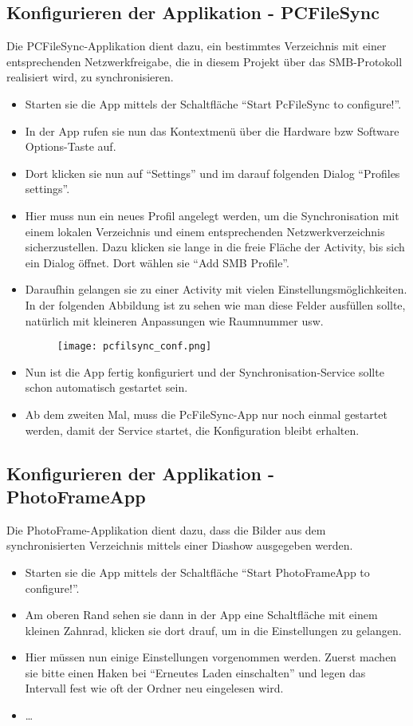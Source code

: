 \begin{flushleft}
  \subsection{Konfigurieren der Applikation - PCFileSync}
  Die PCFileSync-Applikation dient dazu, ein bestimmtes Verzeichnis mit einer entsprechenden Netzwerkfreigabe, die in diesem Projekt über das SMB-Protokoll realisiert wird, zu synchronisieren.
    \begin{itemize}
      \item Starten sie die App mittels der Schaltfläche ``Start PcFileSync to configure!''.
      \item In der App rufen sie nun das Kontextmenü über die Hardware bzw Software Options-Taste auf.
      \item Dort klicken sie nun auf ``Settings'' und im darauf folgenden Dialog ``Profiles settings''.
      \item Hier muss nun ein neues Profil angelegt werden, um die Synchronisation mit einem lokalen Verzeichnis und einem entsprechenden Netzwerkverzeichnis sicherzustellen. Dazu klicken sie lange in die freie Fläche der Activity, bis sich ein Dialog öffnet. Dort wählen sie ``Add SMB Profile''.
      \item Daraufhin gelangen sie zu einer Activity mit vielen Einstellungsmöglichkeiten. In der folgenden Abbildung ist zu sehen wie man diese Felder ausfüllen sollte, natürlich mit kleineren Anpassungen wie Raumnummer usw.
      \begin{figure}[htb]
        \centering
        \texttt{[image: pcfilsync\_conf.png]}\\ %
      \end{figure}
      \item Nun ist die App fertig konfiguriert und der Synchronisation-Service sollte schon automatisch gestartet sein.
      \item Ab dem zweiten Mal, muss die PcFileSync-App nur noch einmal gestartet werden, damit der Service startet, die Konfiguration bleibt erhalten.      
    \end{itemize}
  \subsection{Konfigurieren der Applikation - PhotoFrameApp}
  	Die PhotoFrame-Applikation dient dazu, dass die Bilder aus dem synchronisierten Verzeichnis mittels einer Diashow ausgegeben werden.
    \begin{itemize}
      \item Starten sie die App mittels der Schaltfläche ``Start PhotoFrameApp to configure!''.
      \item Am oberen Rand sehen sie dann in der App eine Schaltfläche mit einem kleinen Zahnrad, klicken sie dort drauf, um in die Einstellungen zu gelangen.
      \item Hier müssen nun einige Einstellungen vorgenommen werden. Zuerst machen sie bitte einen Haken bei ``Erneutes Laden einschalten'' und legen das Intervall fest wie oft der Ordner neu eingelesen wird.
      \item \dots
    \end{itemize}

\end{flushleft}
